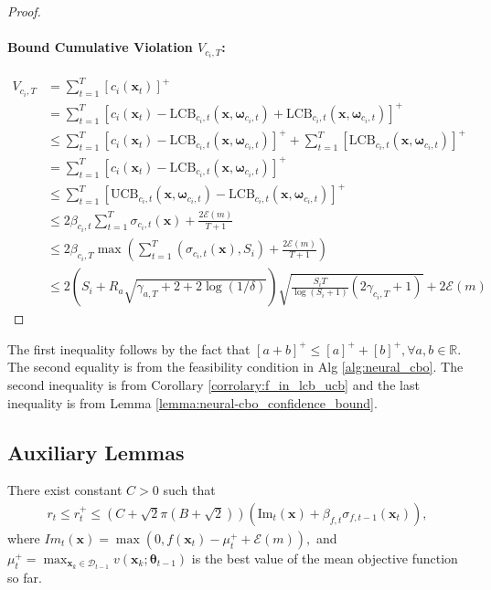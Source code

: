 \begin{proof}
\paragraph{Bound Cumulative Violation $V_{c_i, T}$:}
\begin{align*}
V_{c_i, T}  & = \sum_{t=1}^T [c_i(\mathbf{x}_t)]^+ \\
& = \sum_{t=1}^T[c_i(\mathbf{x}_t) - \text{LCB}_{c_i,t}(\mathbf{x}, \boldsymbol{\omega}_{c_i,t}) + \text{LCB}_{c_i,t}(\mathbf{x}, \boldsymbol{\omega}_{c_i,t})]^+
\\
& \le \sum_{t=1}^T[c_i(\mathbf{x}_t) - \text{LCB}_{c_i,t}(\mathbf{x}, \boldsymbol{\omega}_{c_i,t})]^+  + \sum_{t=1}^T [\text{LCB}_{c_i,t}(\mathbf{x}, \boldsymbol{\omega}_{c_i,t})]^+ 
\\
& = \sum_{t=1}^T[c_i(\mathbf{x}_t) - \text{LCB}_{c_i,t}(\mathbf{x}, \boldsymbol{\omega}_{c_i,t})]^+
\\
& \le \sum_{t=1}^T[\text{UCB}_{c_i,t}(\mathbf{x}, \boldsymbol{\omega}_{c_i,t}) - \text{LCB}_{c_i,t}(\mathbf{x}, \boldsymbol{\omega}_{c_i,t})]^+
\\
& \le 2 \beta_{c_i,t} \sum_{t=1}^T \sigma_{c_i,t}(\mathbf{x})  + \frac{2 \mathcal{E}(m)}{T+1} 
\\ 
& \le 2 \beta_{c_i,T} \max\left (\sum_{t=1}^T \left(\sigma_{c_i,t}(\mathbf{x}), S_i \right)  + \frac{2 \mathcal{E}(m)}{T+1}  \right)
\\
& \le 2 \left(S_i + R_a \sqrt{\gamma_{a,T} + 2 + 2 \log(1/\delta)} \right) \sqrt{\frac{ S_i T}{\log(S_i+1)} (2\gamma_{c_i,T}+1)} + 2 \mathcal{E}(m)
\end{align*}
\end{proof}

The first inequality follows by the fact that $[a+b]^+ \le [a]^+ + [b]^+, \forall a,b \in \mathbb{R}$. The second equality is from the feasibility condition in Alg \ref{alg:neural_cbo}. The second inequality is from Corollary  \ref{corrolary:f_in_lcb_ucb} and the last inequality is from Lemma \ref{lemma:neural-cbo_confidence_bound}. 



\subsection{Auxiliary Lemmas}
\begin{auxlemma}
    \label{lemma:neural_cbo_objective_rt}
    There exist constant $C > 0$ such that
    \begin{align*}
        r_t \le r_t^+ \le \left(C + \sqrt{2}\pi(B + \sqrt{2}) \right)\left(\text{Im}_t (\mathbf{x})+ \beta_{f,t} \sigma_{f,t-1}(\mathbf{x}_t) \right),
    \end{align*}
    where $Im_t (\mathbf{x}) = \max(0, f(\mathbf{x}_t) - \mu_t^+ + \mathcal{E}(m)), $ and $\mu^+_t = \max_{\mathbf{x}_k \in \mathcal{D}_{t-1}} v(\mathbf{x}_k; \boldsymbol{\theta}_{t-1})$ is the best value of the mean objective function so far. 
\end{auxlemma}

